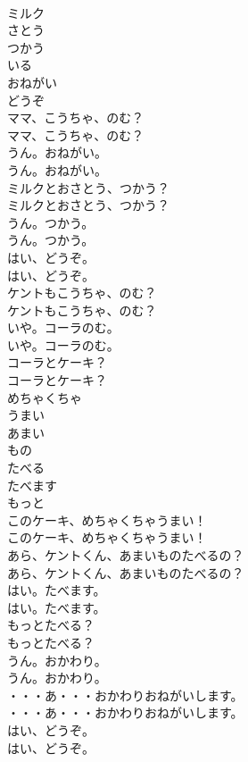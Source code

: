 \documentclass[8pt]{extreport}
\begin{document}
\begin{CJK}{UTF8}{min}
\\	ミルク
\\	さとう
\\	つかう
\\	いる
\\	おねがい
\\	どうぞ
\\	ママ、こうちゃ、のむ？	
\\	ママ、こうちゃ、のむ？ 
\\	うん。おねがい。	
\\	うん。おねがい。 
\\	ミルクとおさとう、つかう？	
\\	ミルクとおさとう、つかう？ 
\\	うん。つかう。	
\\	うん。つかう。 
\\	はい、どうぞ。	
\\	はい、どうぞ。 
\\	ケントもこうちゃ、のむ？	
\\	ケントもこうちゃ、のむ？ 
\\	いや。コーラのむ。	
\\	いや。コーラのむ。 
\\	コーラとケーキ？	
\\	コーラとケーキ？ 
\\	めちゃくちゃ
\\	うまい
\\	あまい
\\	もの
\\	たべる
\\	たべます
\\	もっと
\\	このケーキ、めちゃくちゃうまい！	
\\	このケーキ、めちゃくちゃうまい！ 
\\	あら、ケントくん、あまいものたべるの？	
\\	あら、ケントくん、あまいものたべるの？ 
\\	はい。たべます。	
\\	はい。たべます。 
\\	もっとたべる？	
\\	もっとたべる？ 
\\	うん。おかわり。	
\\	うん。おかわり。 
\\	・・・あ・・・おかわりおねがいします。	
\\	・・・あ・・・おかわりおねがいします。 
\\	はい、どうぞ。	
\\	はい、どうぞ。 

\end{CJK}
\end{document}
